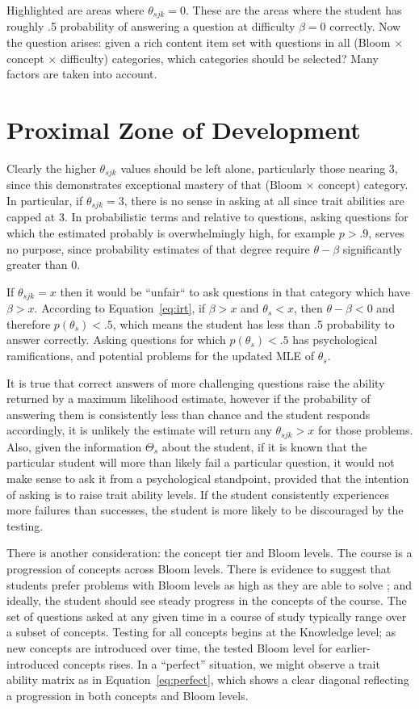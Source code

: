 Highlighted are areas where $\theta_{sjk} = 0$. These are the areas where the
student has roughly .5 probability of answering a question at difficulty
$\beta=0$ correctly.  Now the question arises: given a rich content item set
with questions in all (Bloom $\times$ concept $\times$ difficulty) categories,
which categories should be selected?  Many factors are taken into account.

\section{Proximal Zone of Development}

Clearly the higher $\theta_{sjk}$ values should be left alone, particularly
those nearing 3, since this demonstrates exceptional mastery of that (Bloom
$\times$ concept) category.  In particular, if $\theta_{sjk} = 3$, there is no
sense in asking at all since trait abilities are capped at 3.  In probabilistic
terms and relative to questions, asking questions for which the estimated
probably is overwhelmingly high, for example $p > .9$, serves no purpose, since
probability estimates of that degree require $\theta-\beta$ significantly
greater than 0.

If $\theta_{sjk} = x$ then it would be ``unfair`` to ask questions in that
category which have $\beta > x$.  According to Equation~\ref{eq:irt}, if $\beta
> x$ and $\theta_s < x$, then $\theta-\beta < 0$ and therefore $p(\theta_s) <
.5$, which means the student has less than .5 probability to answer correctly.
Asking questions for which $p(\theta_s) < .5$ has psychological ramifications,
and potential problems for the updated MLE of $\theta_s$.

It is true that correct answers of more challenging questions raise the ability
returned by a maximum likelihood estimate, however if the probability of
answering them is consistently less than chance and the student responds
accordingly, it is unlikely the estimate will return any $\theta_{sjk} > x$ for
those problems.  Also, given the information $\Theta_s$ about the student, if
it is known that the particular student will more than likely fail a particular
question, it would not make sense to ask it from a psychological standpoint,
provided that the intention of asking is to raise trait ability levels.  If the
student consistently experiences more failures than successes, the student is
more likely to be discouraged by the testing. 

There is another consideration: the concept tier and Bloom levels.  The course
is a progression of concepts across Bloom levels.  There is evidence to suggest
that students prefer problems with Bloom levels as high as they are able to
solve \cite{goel2004}; and ideally, the student should see steady progress in the
concepts of the course.  The set of questions asked at any given time in a course of study
typically range over a subset of concepts.  Testing for all concepts begins at
the Knowledge level; as new concepts are introduced over time, the tested Bloom
level for earlier-introduced concepts rises.  In a ``perfect'' situation, we
might observe a trait ability matrix as in Equation~\ref{eq:perfect}, which
shows a clear diagonal reflecting a progression in both concepts and Bloom
levels.  


